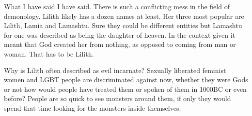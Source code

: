 \documentclass[12pt,twoside,onecolumn,openright,extrafontsizes]{memoir}
\newcommand*\NewPage{\newpage\thispagestyle{empty}\mbox{}}
\begin{document}
{What I have said I have said. There is such a conflicting mess in the field of demonology. Lilith likely has a dozen names at least. Her three most popular are Lilith, Lamia and Lamashtu. Sure they could be different entities but Lamashtu for one was described as being the daughter of heaven. In the context given it meant that God created her from nothing, as opposed to coming from man or woman. That has to be Lilith. 

Why is Lilith often described as evil incarnate? Sexually liberated feminist women and LGBT people are discriminated against now, whether they were Gods or not how would people have treated them or spoken of them in 1000BC or even before? People are so quick to see monsters around them, if only they would spend that time looking for the monsters inside themselves.
}
\end{document}
